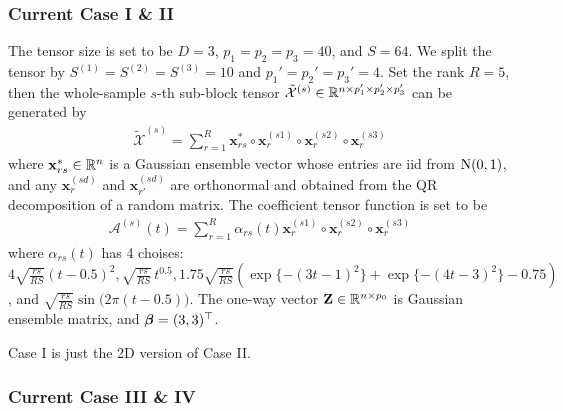\documentclass[10pt]{notes}
\begin{document}
\subsubsection*{Current Case I \& II}
The tensor size is set to be $D=3$, $p_1=p_2=p_3=40$, and $S=64$. We split the tensor by $S^{(1)}=S^{(2)}=S^{(3)}=10$ and $p_1'=p_2'=p_3'=4$. Set the rank $R=5$, then the whole-sample $s$-th sub-block tensor $\tilde{\mathcal{X}}^{(s)}\in\mathbb{R}^{n\times p_1'\times p_2'\times p_3'}$ can be generated by 
\begin{align*}
    \tilde{\mathcal{X}}^{(s)}=\sum_{r=1}^{R} \mathbf{x}_{rs}^*\circ \mathbf{x}_r^{(s1)}\circ \mathbf{x}_r^{(s2)}\circ \mathbf{x}_r^{(s3)}
\end{align*} 
where $\mathbf{x}_{rs}^*\in\mathbb{R}^n$ is a Gaussian ensemble vector whose entries are iid from $\mathrm{N}(0,1)$, and any $\mathbf{x}_{r}^{(sd)}$ and $\mathbf{x}_{r'}^{(sd)}$ are orthonormal and obtained from the QR decomposition of a random matrix. The coefficient tensor function is set to be
\begin{align*}
    \mathcal{A}^{(s)}(t)=\sum_{r=1}^{R} \alpha_{rs}(t)\mathbf{x}_r^{(s1)}\circ \mathbf{x}_r^{(s2)}\circ \mathbf{x}_r^{(s3)}
\end{align*}
where $\alpha_{rs}(t)$ has 4 choises: $4\sqrt{\frac{rs}{RS}}(t-0.5)^2, \sqrt{\frac{rs}{RS}}\, t^{0.5}, 1.75\sqrt{\frac{rs}{RS}}
\left(\exp\{-(3t-1)^2\} + \exp\{-(4t-3)^2\} - 0.75\right)$,
and
$\sqrt{\frac{rs}{RS}} \sin\bigl(2\pi(t-0.5)\bigr)$.
The one-way vector $\mathbf{Z}\in\mathbb{R}^{n\times p_0}$ is Gaussian ensemble matrix, and $\bm{\beta}=(3,3)^\top$.

\begin{remark}
    Case I is just the 2D version of Case II.
\end{remark}

\subsubsection*{Current Case III \& IV}
\end{document}
